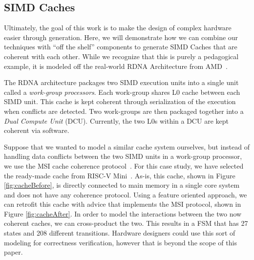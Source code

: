 \documentclass[sigplan,anonymous,review]{acmart}
\begin{document}
\subsection{SIMD Caches}\label{sec:cache}
Ultimately, the goal of this work is to make the design of complex hardware easier through generation. Here, we will demonstrate how we can combine our techniques with ``off the shelf'' components to generate SIMD Caches that are coherent with each other. While we recognize that this is purely a pedagogical example, it is modeled off the real-world RDNA Architecture from AMD~\cite{}.

The RDNA architecture packages two SIMD execution units into a single unit called a \textit{work-group processors}. Each work-group shares L0 cache between each SIMD unit. This cache is kept coherent through serialization of the execution when conflicts are detected. Two work-groups are then packaged together into a \textit{Dual Compute Unit} (DCU). Currently, the two L0s within a DCU are kept coherent via software. 

Suppose that we wanted to model a similar cache system ourselves, but instead of handling data conflicts between the two SIMD units in a work-group processor, we use the MSI cache coherence protocol~\cite{}. For this case study, we have selected the ready-made cache from RISC-V Mini~\cite{}. As-is, this cache, shown in Figure \ref{fig:cacheBefore}, is directly connected to main memory in a single core system and does not have any coherence protocol. Using a feature oriented approach, we can retrofit this cache with advice that implements the MSI protocol, shown in Figure \ref{fig:cacheAfter}. In order to model the interactions between the two now coherent caches, we can cross-product the two. This results in a FSM that has 27 states and 208 different transitions. Hardware designers could use this sort of modeling for correctness verification, however that is beyond the scope of this paper.
\end{document}
